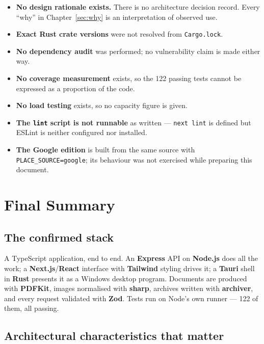 \documentclass[11pt,a4paper]{report}
\newcommand{\code}[1]{\texttt{\small #1}}
\DeclareRobustCommand{\file}[1]{{\small\nolinkurl{#1}}}
\begin{document}
\begin{itemize}
\item \textbf{No design rationale exists.} There is no architecture decision
record. Every ``why'' in Chapter~\ref{sec:why} is an interpretation of observed
use.
\item \textbf{Exact Rust crate versions} were not resolved from
\file{Cargo.lock}.
\item \textbf{No dependency audit} was performed; no vulnerability claim is made
either way.
\item \textbf{No coverage measurement} exists, so the 122 passing tests cannot be
expressed as a proportion of the code.
\item \textbf{No load testing} exists, so no capacity figure is given.
\item \textbf{The \code{lint} script is not runnable} as written --- \code{next
lint} is defined but ESLint is neither configured nor installed.
\item \textbf{The Google edition} is built from the same source with
\code{PLACE\_SOURCE=google}; its behaviour was not exercised while preparing this
document.
\end{itemize}

\chapter{Final Summary}
\label{sec:summary}

\section{The confirmed stack}

A TypeScript application, end to end. An \textbf{Express} API on \textbf{Node.js}
does all the work; a \textbf{Next.js}/\textbf{React} interface with
\textbf{Tailwind} styling drives it; a \textbf{Tauri} shell in \textbf{Rust}
presents it as a Windows desktop program. Documents are produced with
\textbf{PDFKit}, images normalised with \textbf{sharp}, archives written with
\textbf{archiver}, and every request validated with \textbf{Zod}. Tests run on
Node's own runner --- 122 of them, all passing.

\section{Architectural characteristics that matter}
\end{document}
